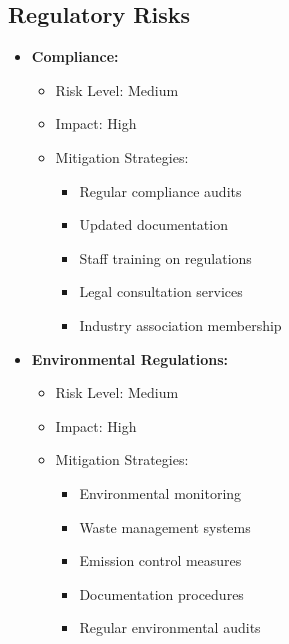 \subsection{Regulatory Risks}
\begin{itemize}
    \item \textbf{Compliance:}
    \begin{itemize}
        \item Risk Level: Medium
        \item Impact: High
        \item Mitigation Strategies:
        \begin{itemize}
            \item Regular compliance audits
            \item Updated documentation
            \item Staff training on regulations
            \item Legal consultation services
            \item Industry association membership
        \end{itemize}
    \end{itemize}
    
    \item \textbf{Environmental Regulations:}
    \begin{itemize}
        \item Risk Level: Medium
        \item Impact: High
        \item Mitigation Strategies:
        \begin{itemize}
            \item Environmental monitoring
            \item Waste management systems
            \item Emission control measures
            \item Documentation procedures
            \item Regular environmental audits
        \end{itemize}
    \end{itemize}
\end{itemize}

